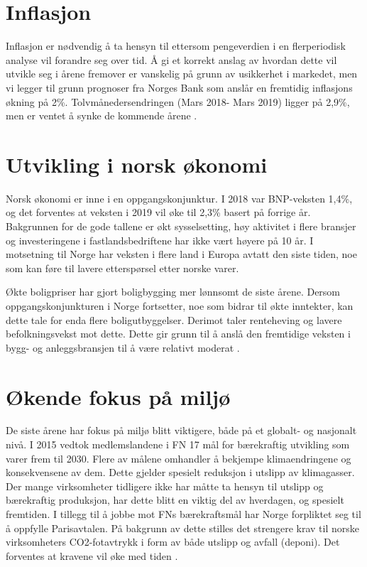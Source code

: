 \section{Inflasjon}
Inflasjon er nødvendig å ta hensyn til ettersom pengeverdien i en flerperiodisk analyse vil forandre seg over tid. Å gi et korrekt anslag av hvordan dette vil utvikle seg i årene fremover er vanskelig på grunn av usikkerhet i markedet, men vi legger til grunn prognoser fra Norges Bank som anslår en fremtidig inflasjons økning på 2\%. Tolvmånedersendringen (Mars 2018- Mars 2019) ligger på 2,9\%, men er ventet å synke de kommende årene \cite{inflasjon}.

\section{Utvikling i norsk økonomi}
Norsk økonomi er inne i en oppgangskonjunktur. I 2018 var BNP-veksten 1,4\%, og det forventes at veksten i 2019 vil øke til 2,3\% basert på forrige år. Bakgrunnen for de gode tallene er økt sysselsetting, høy aktivitet i flere bransjer og investeringene i fastlandsbedriftene har ikke vært høyere på 10 år. I motsetning til Norge har veksten i flere land i Europa avtatt den siste tiden, noe som kan føre til lavere etterspørsel etter norske varer. 

\indent \newline
Økte boligpriser har gjort boligbygging mer lønnsomt de siste årene. Dersom oppgangskonjunkturen i Norge fortsetter, noe som bidrar til økte inntekter, kan dette tale for enda flere boligutbyggelser. Derimot taler renteheving og lavere befolkningsvekst mot dette. Dette gir grunn til å anslå den fremtidige veksten i bygg- og anleggsbransjen til å være relativt moderat \cite{norskokonomi}.

\section{Økende fokus på miljø}
De siste årene har fokus på miljø blitt viktigere, både på et globalt- og nasjonalt nivå. I 2015 vedtok medlemslandene i FN 17 mål for bærekraftig utvikling som varer frem til 2030. Flere av målene omhandler å bekjempe klimaendringene og konsekvensene av dem. Dette gjelder spesielt reduksjon i utslipp av klimagasser. Der mange virksomheter tidligere ikke har måtte ta hensyn til utslipp og bærekraftig produksjon, har dette blitt en viktig del av hverdagen, og spesielt fremtiden. I tillegg til å jobbe mot FNs bærekraftsmål har Norge forpliktet seg til å oppfylle Parisavtalen. På bakgrunn av dette stilles det strengere krav til norske virksomheters CO2-fotavtrykk i form av både utslipp og avfall (deponi). Det forventes at kravene vil øke med tiden \cite{baerekraftsmaal}.


